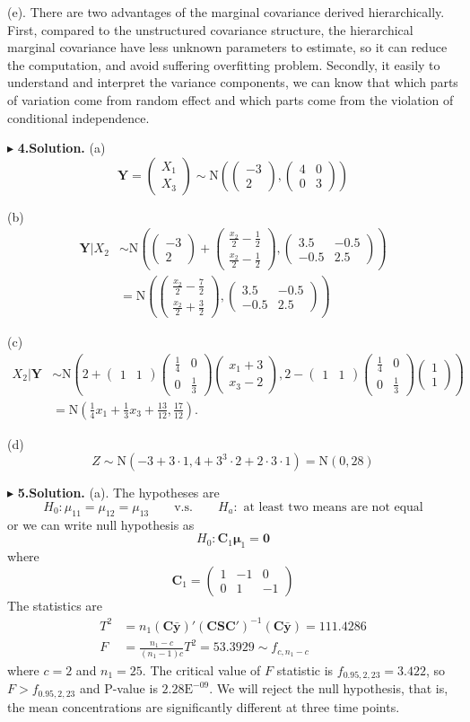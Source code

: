 \documentclass[letterpaper, 12pt]{article}
\newcommand{\ba}{$$\begin{aligned}}
\newcommand{\ea}{\end{aligned}$$}
\newcommand{\lma}{\left(\begin{matrix}}
\newcommand{\rma}{\end{matrix}\right)}
\begin{document}
(e). There are two advantages of the marginal covariance derived hierarchically. First, compared to the unstructured covariance structure, the hierarchical marginal covariance have less unknown parameters to estimate, so it can reduce the computation, and avoid suffering overfitting problem. Secondly, it easily to understand and interpret the variance components, we can know that which parts of variation come from random effect and which parts come from the violation of conditional independence.




$\blacktriangleright$ \textbf{4.\quad Solution.} 
(a) 
$$
\bm{Y}=\lma X_1\\X_3\rma\sim \text{N}\left(\lma -3 \\2\rma,\lma 4&0\\0&3\rma\right)
$$

(b)
\ba
\bm{Y}|X_2&\sim\text{N}\left(\lma -3\\2\rma+\lma \frac{x_2}{2}-\frac12\\\frac{x_2}2-\frac12\rma,\lma 3.5 &-0.5\\-0.5 &2.5\rma\right)\\
&=\text{N}\left(\lma \frac{x_2}{2}-\frac72\\\frac{x_2}2+\frac32\rma,\lma 3.5 &-0.5\\-0.5 &2.5\rma\right)
\ea


(c)
\ba
X_2|\bm{Y}&\sim\text{N}\left(2+\lma 1&1\rma\lma \frac14&0\\0&\frac13\rma\lma x_1+3\\x_3-2\rma, 2-\lma 1&1\rma\lma \frac14&0\\0&\frac13\rma\lma1\\1\rma\right)\\
&=\text{N}\left(\frac14x_1+\frac13x_3+\frac{13}{12},\frac{17}{12}\right).
\ea

(d) 
$$
Z\sim\text{N}(-3+3\cdot1,4+3^3\cdot2+2\cdot3\cdot1)=\text{N}(0,28)
$$

$\blacktriangleright$ \textbf{5.\quad Solution.}
(a). The hypotheses are
$$
H_0:\mu_{11}=\mu_{12}=\mu_{13}\qquad\text{v.s.}\qquad H_a: \text{ at least two means are not equal}
$$
or we can write null hypothesis as
$$
H_0: \bm{C}_1\bm{\mu}_1=\bm{0}
$$
where
$$
\bm{C}_1=\lma 1 &-1 &0\\ 0 &1 &-1\rma
$$
The statistics are
\ba
T^2&=n_1(\bm{C\bar{y}})'(\bm{CSC}')^{-1}(\bm{C\bar{y}})=111.4286\\
F&=\frac{n_1-c}{(n_1-1)c}T^2=53.3929\sim f_{c,n_1-c}
\ea
where $c=2$ and $n_1=25$. The critical value of $F$ statistic is $f_{0.95,2,23}=3.422$, so $F>f_{0.95,2,23}$ and P-value is $2.28\text{E}^{-09}$. We will reject the  null hypothesis, that is, the mean concentrations are significantly different at three time points.
\end{document}
